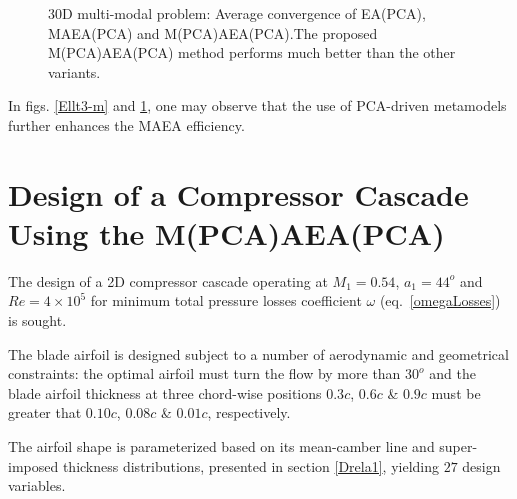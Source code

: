 \begin{figure}[h!]
\begin{minipage}[b]{1\linewidth}
 \centering
\end{minipage}
\caption{30D multi-modal problem: Average convergence of EA(PCA), MAEA(PCA) and M(PCA)AEA(PCA).The proposed M(PCA)AEA(PCA) method performs much better than the other variants.} 
\label{mmt3m}
\end{figure}

In figs. \ref{Ellt3-m} and \ref{mmt3m}, one may observe that the use of PCA-driven metamodels further enhances the MAEA efficiency.


\section{Design of a Compressor Cascade Using the M(PCA)AEA(PCA)}


The design of a 2D compressor cascade operating at $M_1\!=\!0.54$, $a_1\!=\!44^o$ and $Re\!=\!4\times10^5$ for minimum total pressure losses coefficient $\omega$ (eq.\ \ref{omegaLosses}) is sought. 

The blade airfoil is designed subject to a number of aerodynamic and geometrical constraints: the optimal airfoil must turn the flow by more than $30^o$ and the blade airfoil thickness at three chord-wise positions $0.3c$, $0.6c$ \& $0.9c$ must be greater that $0.10c$, $0.08c$ \& $0.01c$,  respectively.     

The airfoil shape is parameterized based on its mean-camber line and super-imposed thickness distributions, presented in section \ref{Drela1}, yielding $27$ design variables.

